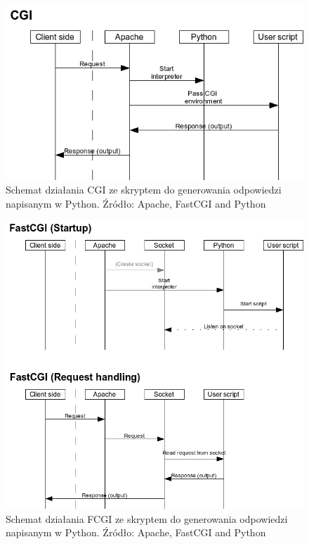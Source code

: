 \documentclass[eng]{mgr}
\begin{document}
			\begin{center}
				\begin{figure}[ht]
					\centering
					\includegraphics[scale=0.7]{flow_cgi.png}
					\caption{Schemat działania CGI ze skryptem do generowania odpowiedzi napisanym w Python. Źródło: Apache, FastCGI and Python}
				\end{figure}
			\end{center}
		
			\begin{center}
				\begin{figure}[ht]
					\centering
					\includegraphics[scale=0.7]{flow_fastcgi.png}
					\caption{Schemat działania FCGI ze skryptem do generowania odpowiedzi napisanym w Python. Źródło: Apache, FastCGI and Python}
				\end{figure}
			\end{center}
		
\end{document}
